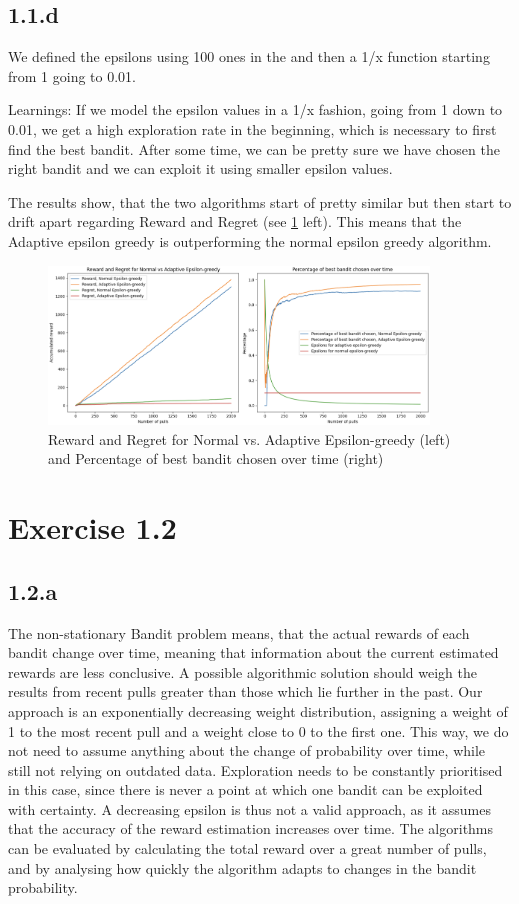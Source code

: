 \documentclass{article} %
\begin{document}
	\subsection{1.1.d}
	We defined the epsilons using 100 ones in the and then a 1/x function starting from 1 going to 0.01.
	
	Learnings: If we model the epsilon values in a 1/x fashion, going from 1 down to 0.01, we get a high exploration rate in the beginning, which is necessary to first find the best bandit. After some time, we can be pretty sure we have chosen the right bandit and we can exploit it using smaller epsilon values.
	
	The results show, that the two algorithms start of pretty similar but then start to drift apart regarding Reward and Regret (see \ref{fig:1.1.d} left). This means that the Adaptive epsilon greedy is outperforming the normal epsilon greedy algorithm.
	\newline
	\begin{figure}[h!]
		\centering
		\includegraphics[width=0.9\textwidth]{images/1.1.d}
		\caption{Reward and Regret for Normal vs. Adaptive Epsilon-greedy (left) and Percentage of best bandit chosen over time (right)}
		\label{fig:1.1.d}
		
	\end{figure}
	
	
	\section{Exercise 1.2}
	\subsection{1.2.a}
	The non-stationary Bandit problem means, that the actual rewards of each bandit change over time, meaning that information about the current estimated rewards are less conclusive. A possible algorithmic solution should weigh the results from recent pulls greater than those which lie further in the past. Our approach is an exponentially decreasing weight distribution, assigning a weight of 1 to the most recent pull and a weight close to 0 to the first one. This way, we do not need to assume anything about the change of probability over time, while still not relying on outdated data.
	Exploration needs to be constantly prioritised in this case, since there is never a point at which one bandit can be exploited with certainty. A decreasing epsilon is thus not a valid approach, as it assumes that the accuracy of the reward estimation increases over time.
	The algorithms can be evaluated by calculating the total reward over a great number of pulls, and by analysing how quickly the algorithm adapts to changes in the bandit probability.
	
\end{document}
